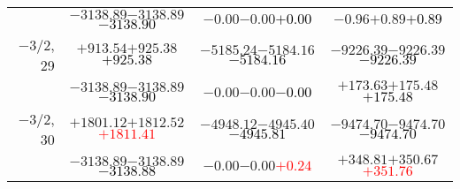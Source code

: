 \documentclass[compress]{beamer}
\begin{document}
\begin{frame}
{\begin{tabular}{r | c | c | c}
           & $-3138.89$\hspace{0.1 cm}$-3138.89$\hspace{0.1 cm}\textcolor{black}{$-3138.90$} & $-0.00$\hspace{0.1 cm}$-0.00$\hspace{0.1 cm}\textcolor{black}{$+0.00$} & $-0.96$\hspace{0.1 cm}$+0.89$\hspace{0.1 cm}\textcolor{black}{$+0.89$} \\
$-$3/2, 29 & $+913.54$\hspace{0.1 cm}$+925.38$\hspace{0.1 cm}\textcolor{black}{$+925.38$} & $-5185.24$\hspace{0.1 cm}$-5184.16$\hspace{0.1 cm}\textcolor{black}{$-5184.16$} & $-9226.39$\hspace{0.1 cm}$-9226.39$\hspace{0.1 cm}\textcolor{black}{$-9226.39$} \\
           & $-3138.89$\hspace{0.1 cm}$-3138.89$\hspace{0.1 cm}\textcolor{black}{$-3138.90$} & $-0.00$\hspace{0.1 cm}$-0.00$\hspace{0.1 cm}\textcolor{black}{$-0.00$} & $+173.63$\hspace{0.1 cm}$+175.48$\hspace{0.1 cm}\textcolor{black}{$+175.48$} \\
$-$3/2, 30 & $+1801.12$\hspace{0.1 cm}$+1812.52$\hspace{0.1 cm}\textcolor{red}{$+1811.41$} & $-4948.12$\hspace{0.1 cm}$-4945.40$\hspace{0.1 cm}\textcolor{black}{$-4945.81$} & $-9474.70$\hspace{0.1 cm}$-9474.70$\hspace{0.1 cm}\textcolor{black}{$-9474.70$} \\
           & $-3138.89$\hspace{0.1 cm}$-3138.89$\hspace{0.1 cm}\textcolor{black}{$-3138.88$} & $-0.00$\hspace{0.1 cm}$-0.00$\hspace{0.1 cm}\textcolor{red}{$+0.24$} & $+348.81$\hspace{0.1 cm}$+350.67$\hspace{0.1 cm}\textcolor{red}{$+351.76$} \\
\end{tabular}}
\end{frame}
\end{document}
